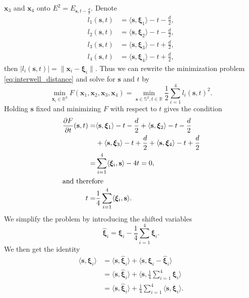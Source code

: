 $\textbf{x}_3$ and $\textbf{x}_4$ onto $E^2 = E_{\textbf{s},t-\frac{d}{2}}$.
%
Denote
%
\begin{equation}
\begin{aligned}
l_1(\textbf{s},t) &=  \langle \textbf{s}, \boldsymbol{\xi}_1 \rangle - t  - \frac{d}{2}, \\
l_2(\textbf{s},t) &=  \langle \textbf{s}, \boldsymbol{\xi}_2 \rangle - t  - \frac{d}{2}, \\
l_3(\textbf{s},t) &=  \langle \textbf{s}, \boldsymbol{\xi}_3 \rangle - t  + \frac{d}{2}, \\
l_4(\textbf{s},t) &=  \langle \textbf{s}, \boldsymbol{\xi}_4 \rangle - t  + \frac{d}{2},
\label{eq:interwell_lengths} 
\end{aligned}
\end{equation}
%
then $|l_i(\textbf{s},t)| = \| \textbf{x}_i - \boldsymbol{\xi}_i \|$.
Thus we can rewrite the minimization problem \eqref{eq:interwell_distance} 
and solve for $\textbf{s}$ and $t$ by
%
\begin{equation}
\min_{ \textbf{x}_i \in \mathbb{R}^3 } F(\textbf{x}_1,\textbf{x}_2,\textbf{x}_3,\textbf{x}_4) 
= \min_{ \textbf{s} \in \mathbb{S}^2, t \in \mathbb{R}} \frac{1}{2}  \sum_{i=1}^4 l_i(\textbf{s},t)^2.
\label{eq:interwell_st}
\end{equation}
%
Holding $\textbf{s}$ fixed and minimizing $F$ with respect to $t$ gives
the condition
%
\begin{align}
\frac{\partial F}{\partial t} (\textbf{s},t) =  
   &\langle \textbf{s},\boldsymbol{\xi}_1 \rangle - t  - \frac{d}{2} 
+  \langle \textbf{s},\boldsymbol{\xi}_2 \rangle - t  - \frac{d}{2} \\
&+ \langle \textbf{s},\boldsymbol{\xi}_3 \rangle - t  + \frac{d}{2} 
+  \langle \textbf{s},\boldsymbol{\xi}_4 \rangle - t  + \frac{d}{2} \\
= &\sum_{i=1}^4 \langle \boldsymbol{\xi}_i,\textbf{s} \rangle - 4t = 0, \\
\intertext{and therefore} 
t = &\frac{1}{4} \sum_{i=1}^4 \langle \boldsymbol{\xi}_i,\textbf{s} \rangle.
\end{align}
%
We simplify the problem by introducing the shifted variables
\begin{equation}
\hat{\boldsymbol{\xi}}_i = \boldsymbol{\xi}_i - \frac{1}{4} \sum_{i=1}^4 \boldsymbol{\xi}_i.
\end{equation}
%
We then get the identity
%
\begin{equation}
\begin{aligned}
\langle \textbf{s},\boldsymbol{\xi}_i \rangle   &= \langle \textbf{s},\hat{\boldsymbol{\xi}}_i \rangle
												+  \langle \textbf{s},\boldsymbol{\xi}_i - \hat{\boldsymbol{\xi}}_i \rangle\\
										        &= \langle \textbf{s},\hat{\boldsymbol{\xi}}_i \rangle 
										       	+  \Big\langle \textbf{s}, \frac{1}{4} \sum_{i=1}^4 \boldsymbol{\xi}_i \Big\rangle\\
												&= \langle \textbf{s},\hat{\boldsymbol{\xi}}_i \rangle
												+  \frac{1}{4} \sum_{i=1}^4 \langle \textbf{s},\boldsymbol{\xi}_i \rangle.
\end{aligned}												  
\end{equation}
